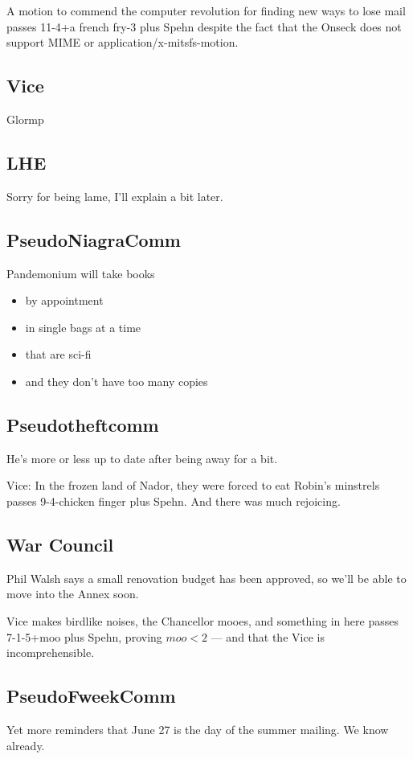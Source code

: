 \documentclass[10pt]{article}
\newcommand{\ps}{ plus Spehn\xspace}
\begin{document}
A motion to commend the computer revolution for finding new ways to
lose mail passes 11-4+a french fry-3\ps despite the fact that the
Onseck does not support MIME or application/x-mitsfs-motion.

\subsection*{Vice}
Glormp

\subsection*{LHE}
Sorry for being lame, I'll explain a bit later.

\subsection*{PseudoNiagraComm}

Pandemonium will take books

\begin{itemize}
\item by appointment
\item in single bags at a time
\item that are sci-fi
\item and they don't have too many copies
\end{itemize}

\subsection*{Pseudotheftcomm}

He's more or less up to date after being away for a bit.

Vice: In the frozen land of Nador, they were forced to eat Robin's
minstrels passes 9-4-chicken finger\ps. And there was much rejoicing.


\subsection*{War Council}

Phil Walsh says a small renovation budget has been approved, so we'll
be able to move into the Annex soon.

Vice makes birdlike noises, the Chancellor mooes, and something in
here passes 7-1-5+moo\ps, proving $moo<2$ --- and that the Vice is
incomprehensible.

\subsection*{PseudoFweekComm}
Yet more reminders that June 27 is the day of the summer mailing.  We
know already.
\end{document}
